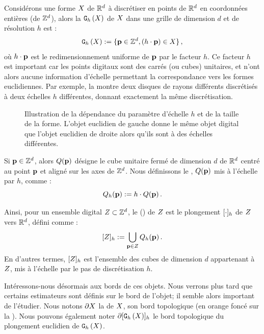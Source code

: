 Considérons une forme $X$ de $\mathbb{R}^d$ à discrétiser en points de $\mathbb{R}^d$ en
coordonnées entières (\cad de $\mathbb{Z}^d$), alors la  $\mathtt{G}_{h}\left(X\right)$ de $X$ dans une grille de dimension $d$ et de résolution $h$
est :
%
\begin{equation}
  \mathtt{G}_{h}\left(X\right) := \{ \mathbf{p} \in \mathbb{Z}^d, (h \cdot \mathbf{p}) \in X \} \,,
\end{equation}
%
où $h \cdot \mathbf{p}$ est le redimensionnement uniforme de $\mathbf{p}$ par le facteur $h$.
Ce facteur $h$ est important car les points digitaux sont des carrés (ou cubes)
unitaires, et n'ont alors aucune information d'échelle permettant la
correspondance vers les formes euclidiennes. Par exemple, la
 montre deux disques de rayons différents
discrétisés à deux échelles $h$ différentes, donnant exactement la même
discrétisation.


\begin{figure}[ht]
  \begin{center}
    
  \end{center}
  \caption[Illustration de la dépendance du paramètre d'échelle $h$.]
  {Illustration de la dépendance du paramètre d'échelle $h$ et de la taille de
  la forme. L'objet euclidien de gauche donne le même objet digital que l'objet
  euclidien de droite alors qu'ils sont à des échelles
  différentes.\label{fig:scale-digital}}
\end{figure}

Si $\mathbf{p} \in \mathbb{Z}^d$, alors $Q({\mathbf{p}})$ désigne le cube unitaire fermé de dimension $d$ de
$\mathbb{R}^d$ centré au point $\mathbf{p}$ et aligné sur les axes de $\mathbb{Z}^d$. Nous définissons
le , \cad $Q({\mathbf{p}})$ mis à l'échelle par $h$, comme :
%
\begin{equation}
  Q_{h}({\mathbf{p}}) := h\cdot Q({\mathbf{p}}) \,.
\end{equation}


Ainsi, pour un ensemble digital $Z \subset \mathbb{Z}^d$, le
 () de $Z$ est le
plongement $\lbrack \cdot \rbrack_{h}$ de $Z$ vers $\mathbb{R}^d$, défini comme :
%
\begin{equation}
  \lbrack Z \rbrack_{h} := \bigcup_{\mathbf{p} \in Z} Q_{h}({\mathbf{p}}) \,.
\end{equation}
%
En d'autres termes, $\lbrack Z \rbrack_{h}$ est l'ensemble des cubes de dimension
$d$ appartenant à $Z$, mis à l'échelle par le pas de discrétisation $h$.


Intéressons-nous désormais aux bords de ces objets. Nous verrons plus tard que
certains estimateurs sont définis sur le bord de l'objet; il semble alors
important de l'étudier. Nous notons $\partial X$ la  de $X$,
\cad son bord topologique (en orange foncé sur la ).
Nous pouvons également noter $\partial \lbrack \mathtt{G}_{h}\left(X\right) \rbrack_{h}$ le bord topologique du
plongement euclidien de $\mathtt{G}_{h}\left(X\right)$.
%
%


